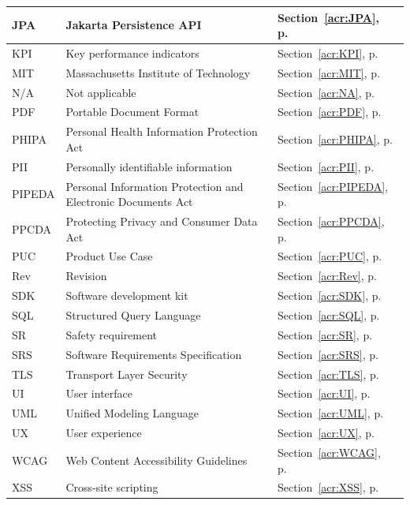 \documentclass[12pt]{article}
\begin{document}
\begin{xltabular}{\textwidth}{|p{1.9cm}|X|p{3.6cm}|}
\hline
JPA & Jakarta Persistence API & Section~\ref{acr:JPA}, p.~\pageref{acr:JPA} \\
\hline
KPI & Key performance indicators & Section~\ref{acr:KPI}, p.~\pageref{acr:KPI} \\
\hline
MIT & Massachusetts Institute of Technology & Section~\ref{acr:MIT}, p.~\pageref{acr:MIT} \\
\hline
N/A & Not applicable & Section~\ref{acr:NA}, p.~\pageref{acr:NA} \\
\hline
PDF & Portable Document Format & Section~\ref{acr:PDF}, p.~\pageref{acr:PDF} \\
\hline
PHIPA & Personal Health Information Protection Act & Section~\ref{acr:PHIPA}, p.~\pageref{acr:PHIPA} \\
\hline
PII & Personally identifiable information & Section~\ref{acr:PII}, p.~\pageref{acr:PII} \\
\hline
PIPEDA & Personal Information Protection and Electronic Documents Act & Section~\ref{acr:PIPEDA}, p.~\pageref{acr:PIPEDA} \\
\hline
PPCDA & Protecting Privacy and Consumer Data Act & Section~\ref{acr:PPCDA}, p.~\pageref{acr:PPCDA} \\
\hline
PUC & Product Use Case & Section~\ref{acr:PUC}, p.~\pageref{acr:PUC} \\
\hline
Rev & Revision & Section~\ref{acr:Rev}, p.~\pageref{acr:Rev} \\
\hline
SDK & Software development kit & Section~\ref{acr:SDK}, p.~\pageref{acr:SDK} \\
\hline
SQL & Structured Query Language & Section~\ref{acr:SQL}, p.~\pageref{acr:SQL} \\
\hline
SR & Safety requirement & Section~\ref{acr:SR}, p.~\pageref{acr:SR} \\
\hline
SRS & Software Requirements Specification & Section~\ref{acr:SRS}, p.~\pageref{acr:SRS} \\
\hline
TLS & Transport Layer Security & Section~\ref{acr:TLS}, p.~\pageref{acr:TLS} \\
\hline
UI & User interface & Section~\ref{acr:UI}, p.~\pageref{acr:UI} \\
\hline
UML & Unified Modeling Language & Section~\ref{acr:UML}, p.~\pageref{acr:UML} \\
\hline
UX & User experience & Section~\ref{acr:UX}, p.~\pageref{acr:UX} \\
\hline
WCAG & Web Content Accessibility Guidelines & Section~\ref{acr:WCAG}, p.~\pageref{acr:WCAG} \\
\hline
XSS & Cross-site scripting & Section~\ref{acr:XSS}, p.~\pageref{acr:XSS} \\
\hline
\end{xltabular}
\normalsize
\end{document}
